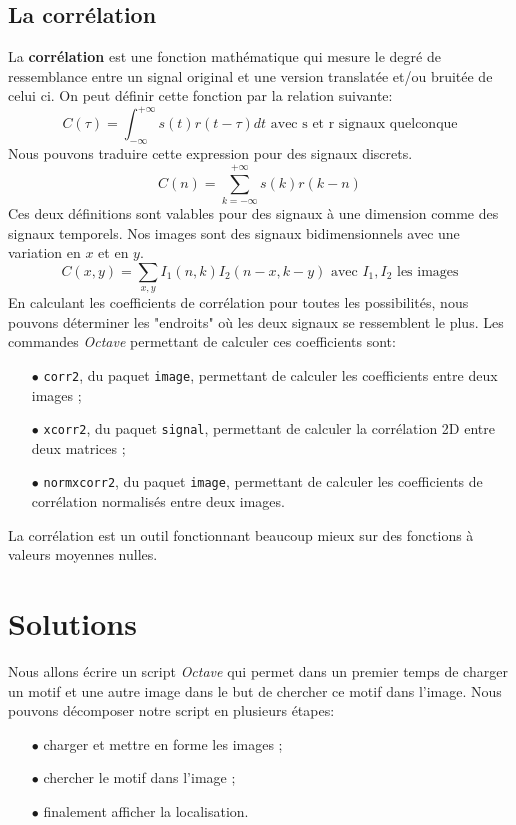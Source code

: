 \documentclass[a4paper,12pt,titlepage]{report}
\newcommand{\octave}{\textit{Octave }}
\begin{document}
		\subsection{La corrélation}
		La \textbf{corrélation} est une fonction mathématique qui mesure le degré de ressemblance entre un signal original et une version translatée et/ou bruitée de celui ci. On peut définir cette fonction par la relation suivante:
		\begin{equation}
			C(\tau)=\int_{-\infty}^{+\infty}s(t)r(t-\tau)dt \text{ avec s et r signaux quelconque}
		\end{equation}
		Nous pouvons traduire cette expression pour des signaux discrets.
		\begin{equation}
			C(n)=\sum_{k = -\infty}^{+\infty}s(k)r(k-n)	
		\end{equation}		
		Ces deux définitions sont valables pour des signaux à une dimension comme des signaux temporels. Nos images sont des signaux bidimensionnels avec une variation en $x$ et en $y$.
		\begin{equation}
			C(x,y)=\sum_{x,y} I_1(n,k)I_2(n-x,k-y) \text{ avec }I_1, I_2 \text{ les images}
		\end{equation}
		En calculant les coefficients de corrélation pour toutes les possibilités, nous pouvons déterminer les "endroits" où les deux signaux se ressemblent le plus.
		Les commandes \octave permettant de calculer ces coefficients sont:
		\begin{itemize}
		\item[$\bullet$] \texttt{corr2}, du paquet \texttt{image}, permettant de calculer les coefficients entre deux images ;
		\item[$\bullet$] \texttt{xcorr2}, du paquet \texttt{signal}, permettant de calculer la corrélation 2D entre deux matrices ;
		\item[$\bullet$] \texttt{normxcorr2}, du paquet \texttt{image}, permettant de calculer les coefficients de corrélation normalisés entre deux images. 
		\end{itemize}		
		La corrélation est un outil fonctionnant beaucoup mieux sur des fonctions à valeurs moyennes nulles.
	\section{Solutions}
	Nous allons écrire un script \octave qui permet dans un premier temps de charger un motif et une autre image dans le but de chercher ce motif dans l'image. Nous pouvons décomposer notre script en plusieurs étapes:
	\begin{itemize}
		\item[$\bullet$] charger et mettre en forme les images ;
		\item[$\bullet$] chercher le motif dans l'image ;
		\item[$\bullet$] finalement afficher la localisation.
	\end{itemize}	   
\end{document}
